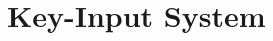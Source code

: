 
\section{Key-Input System}\label{sec:key-input-system}

\renewcommand{\kapitelautor}{Autor: Felix Zwickelstorfer} %

%
%

\renewcommand{\kapitelautor}{}

